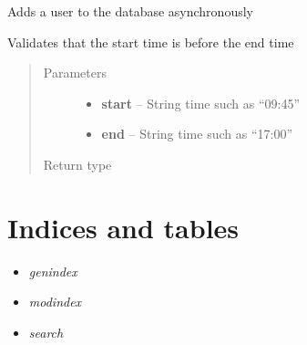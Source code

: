 \documentclass[letterpaper,10pt,english]{sphinxmanual}
\begin{document}
\begin{fulllineitems}
\label{code:timetracker.utils.calendar_utils.useredit}
Adds a user to the database asynchronously

\end{fulllineitems}


\begin{fulllineitems}
\label{code:timetracker.utils.calendar_utils.validate_time}
Validates that the start time is before the end time
\begin{quote}\begin{description}
\item[{Parameters}] \leavevmode\begin{itemize}
\item {} 
\textbf{start} -- String time such as ``09:45''

\item {} 
\textbf{end} -- String time such as ``17:00''

\end{itemize}

\item[{Return type}] \leavevmode
{}

\end{description}\end{quote}

\end{fulllineitems}



\chapter{Indices and tables}
\label{index:indices-and-tables}\begin{itemize}
\item {} 
\emph{genindex}

\item {} 
\emph{modindex}

\item {} 
\emph{search}

\end{itemize}
\end{document}
